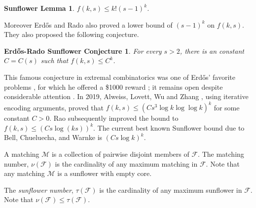 \documentclass[runningheads,12pt,a4paper]{article}
\newtheorem*{sunlemma}{Sunflower Lemma}
\newtheorem*{sunconj}{Erd\H{o}s-Rado Sunflower Conjecture}
\begin{document}
	\begin{sunlemma}\label{sunlemma}
		$f(k,s) \leq k!(s-1)^k$.
	\end{sunlemma}
	
	Moreover Erd\H{o}s and Rado \cite{erdosrado1960} also proved a lower bound of $(s-1)^k$ on $f(k,s)$. They also proposed the following conjecture.
	
	\begin{sunconj}\label{sunconj}
		For every $s >2$, there is an constant $C=C(s)$ such that
		$f(k,s) \leq C^k$.
	\end{sunconj}
	This famous conjecture in extremal combinatorics
	was one of Erd\H{o}s’ favorite problems \cite{erdos1981}, for which he offered a \$1000 reward \cite{erdos1990}; it remains open despite
	considerable attention \cite{kostochka2000}.
	In 2019, Alweiss, Lovett, Wu and Zhang \cite{alweiss2020}, using iterative encoding arguments, proved that $f(k,s) 
	\leq (Cs^3\log k \log\log k)^k$ for some constant $C>0$.
	Rao \cite{rao2020} subsequently improved the bound to $f(k,s) \leq (Cs\log (ks))^k$. The current best known Sunflower bound
	due to Bell, Chueluecha, and Warnke \cite{Bell2021} is $(Cs\log k)^k$.
	
	
	A matching $\mathcal{M}$ is a collection of pairwise disjoint members of $\mathcal{F}$. The matching number,
	$\nu(\mathcal{F})$ is the cardinality of any maximum matching in $\mathcal{F}$. Note that any matching $\mathcal{M}$ is a sunflower with empty core.
	
	The \emph{sunflower number},
	$\tau(\mathcal{F})$ is the cardinality of any maximum sunflower in $\mathcal{F}$. Note that 
	$\nu(\mathcal{F}) \leq \tau(\mathcal{F})$.
	
\end{document}
